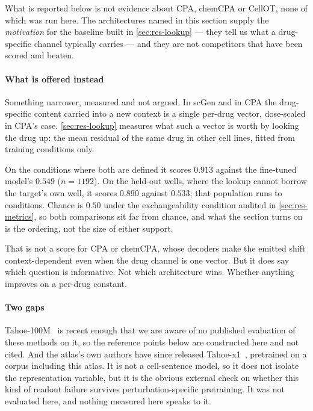 \begin{scopelimit}
What is reported below is not evidence about CPA, chemCPA or CellOT, none of
which was run here. The architectures named in this section supply the
\emph{motivation} for the baseline built in \cref{sec:res-lookup} --- they tell
us what a drug-specific channel typically carries --- and they are not
competitors that have been scored and beaten.
\end{scopelimit}

\paragraph{What is offered instead} Something narrower, measured and not argued.
In scGen and in CPA the drug-specific content carried into a new context is a
single per-drug vector, dose-scaled in CPA's case. \cref{sec:res-lookup}
measures what such a vector is worth by looking the drug up: the mean residual of
the same drug in other cell lines, fitted from training conditions
only.

On the conditions where both are defined it scores $0.913$ against the fine-tuned
model's $0.549$ ($n = \num{1192}$). On the held-out wells, where the lookup cannot
borrow the target's own well, it scores $0.890$ against $0.533$; that population
runs to  conditions. Chance is $0.50$ under the
exchangeability condition audited in \cref{sec:res-metrics}, so both comparisons
sit far from chance, and what the section turns
on is the ordering, not the size of either support.

That is not a score for CPA or chemCPA, whose decoders make the emitted shift
context-dependent even when the drug channel is one vector. But it does say which
question is informative. Not which architecture wins. Whether anything improves
on a per-drug constant.

\paragraph{Two gaps} Tahoe-100M~\cite{tahoe100m} is recent enough that we are
aware of no published evaluation of these methods on it, so the reference points
below are constructed here and not cited. And the atlas's own authors have since
released Tahoe-x1~\cite{tahoex1}, pretrained on a corpus including this atlas.
It is not a cell-sentence model, so it does not isolate the representation
variable, but it is the obvious external check on whether this kind of readout
failure survives perturbation-specific pretraining. It was not evaluated here,
and nothing measured here speaks to it.


